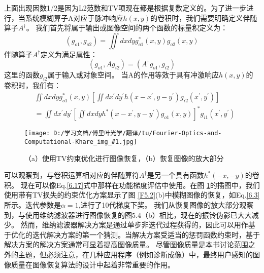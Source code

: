 \documentclass[12pt, UTF8]{ctexart}%
\numberwithin{equation}{section}
\numberwithin{figure}{section}
\newcommand {\InsertPic}[3]{\begin{figure}[htbp]\centering \texttt{[image: D:/学习文档/傅里叶光学/翻译/tu/Fourier-Optics-and-Computational-Khare\_img\_\#1.jpg]}\caption{#3}  \label{#2}\end{figure}}%
\newcommand{\InsertEqution}[2]{\begin{equation}
  \label{#1}
   #2
 \end{equation}}
\newcommand{\RefEq}[1]{Eq.\ref{#1}}
\newcommand{\InsertInlineEq}[1]{$#1$}
\newcommand{\RefFig}[1]{图 \ref{#1}}
\begin{document}
\begin{sloppypar}
上面出现因数1/2是因为L2范数和TV项现在都是根据复数定义的。为了进一步进行，当系统模糊算子A对应于脉冲响应\InsertInlineEq{h(x,y)}的卷积时，我们需要明确定义伴随算子\InsertInlineEq{A^{\dagger}}。 我们首先将属于输出或图像空间的两个函数的标量积定义为：
\InsertEqution{6.18}{\left(g_{o 1}, g_{o 2}\right)=\iint d x d y g_{o 1}^{*}(x, y) g_{o 2}(x, y)}
伴随算子\InsertInlineEq{A^{\dagger}}定义为满足属性：
\InsertEqution{6.19}{\left(g_{o 1}, A g_{i 2}\right)=\left(A^{\dagger} g_{o 1}, g_{i 2}\right)}
这里的函数\InsertInlineEq{g_{i2}}属于输入或对象空间。 当A的作用等效于具有冲激响应\InsertInlineEq{h(x,y)}的卷积时，我们有：
\InsertEqution{6.20}{\begin{aligned}
  &\iint d x d y g_{o 1}^{*}(x, y)\left[\iint d x^{\prime} d y^{\prime} h\left(x-x^{\prime}, y-y^{\prime}\right) g_{i 2}\left(x^{\prime}, y^{\prime}\right)\right] \\
  &=\iint d x^{\prime} d y^{\prime}\left[\iint d x d y h^{*}\left(x-x^{\prime}, y-y^{\prime}\right) g_{o 1}(x, y)\right]^{*} g_{i 1}\left(x^{\prime}, y^{\prime}\right)
  \end{aligned}}
  \InsertPic{25}{F6.3}{（a）使用TV约束优化进行图像恢复，（b）恢复图像的放大部分}
  可以观察到，与卷积运算相对应的伴随算符\InsertInlineEq{A^{\dagger}}是另一个具有函数\InsertInlineEq{h^*(-x,-y)}的卷积。 现在可以像\RefEq{6.17}式中那样在功能梯度评估中使用。在\RefFig{F6.3}的插图中，我们使用带有TV损失的约束优化方案显示了\RefFig{F5.2}(b)中模糊图像的恢复，如\RefEq{6.3}所示。迭代参数是\InsertInlineEq{\alpha=1},进行了10代梯度下奖。 我们从恢复图像的放大部分观察到，与使用维纳滤波器进行图像恢复的图\InsertInlineEq{5.4}（b）相比，现在的振铃伪影已大大减少。 然而，维纳滤波器解决方案是通过单步非迭代过程获得的，因此可以用作基于优化的迭代解决方案的第一个猜测。当解决方案受适当的惩罚函数约束时，基于解决方案的解决方案通常可显着提高图像质量。 尽管图像质量是本书讨论范围之外的主题，但必须注意，在几种应用程序（例如诊断成像）中，最终用户感知的图像质量在图像恢复算法的设计中起着非常重要的作用。

\end{sloppypar}
\end{document}
